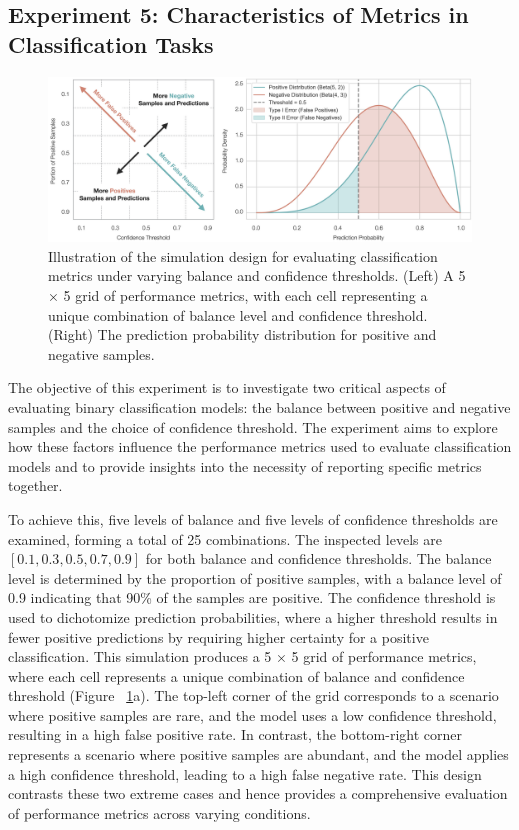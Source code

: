 \subsection{Experiment 5: Characteristics of Metrics in Classification Tasks}

\begin{figure}[H]
    \centering
    \includegraphics[width=1\textwidth]{fig_5.jpg}
    \caption{Illustration of the simulation design for evaluating classification metrics under varying balance and confidence thresholds. (Left) A 5 × 5 grid of performance metrics, with each cell representing a unique combination of balance level and confidence threshold. (Right) The prediction probability distribution for positive and negative samples.}
    \label{fig:s5_classification}
\end{figure}

The objective of this experiment is to investigate two critical aspects of evaluating binary classification models: the balance between positive and negative samples and the choice of confidence threshold. The experiment aims to explore how these factors influence the performance metrics used to evaluate classification models and to provide insights into the necessity of reporting specific metrics together.



To achieve this, five levels of balance and five levels of confidence thresholds are examined, forming a total of 25 combinations. The inspected levels are $[0.1, 0.3, 0.5, 0.7, 0.9]$ for both balance and confidence thresholds. The balance level is determined by the proportion of positive samples, with a balance level of 0.9 indicating that 90\% of the samples are positive. The confidence threshold is used to dichotomize prediction probabilities, where a higher threshold results in fewer positive predictions by requiring higher certainty for a positive classification. This simulation produces a 5 × 5 grid of performance metrics, where each cell represents a unique combination of balance and confidence threshold (Figure ~\ref{fig:s5_classification}a). The top-left corner of the grid corresponds to a scenario where positive samples are rare, and the model uses a low confidence threshold, resulting in a high false positive rate. In contrast, the bottom-right corner represents a scenario where positive samples are abundant, and the model applies a high confidence threshold, leading to a high false negative rate. This design contrasts these two extreme cases and hence provides a comprehensive evaluation of performance metrics across varying conditions.


